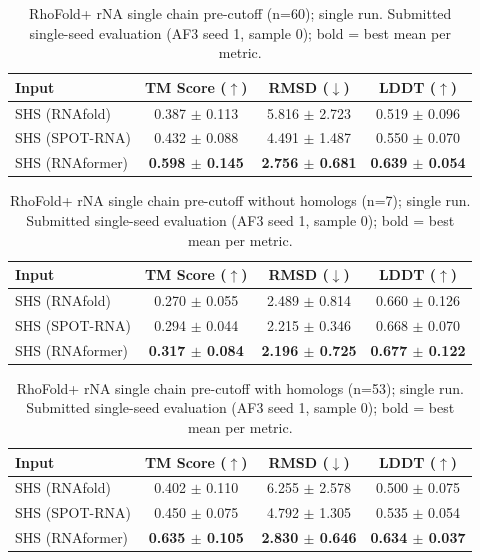 \begin{table}[htbp]
\centering
\caption{RhoFold+ rNA single chain pre-cutoff (n=60); single run. Submitted single-seed evaluation (AF3 seed 1, sample 0); bold = best mean per metric.}
\label{tab:rf_rna_single_chain_pre_cutoff}
\begin{tabular}{lccc}
\toprule
Input & TM Score ($\uparrow$) & RMSD ($\downarrow$) & LDDT ($\uparrow$) \\
\midrule
SHS (RNAfold) & 0.387 $\pm$ 0.113 & 5.816 $\pm$ 2.723 & 0.519 $\pm$ 0.096 \\
SHS (SPOT-RNA) & 0.432 $\pm$ 0.088 & 4.491 $\pm$ 1.487 & 0.550 $\pm$ 0.070 \\
SHS (RNAformer) & \textbf{0.598 $\pm$ 0.145} & \textbf{2.756 $\pm$ 0.681} & \textbf{0.639 $\pm$ 0.054} \\
\bottomrule
\end{tabular}
\end{table}

\begin{table}[htbp]
\centering
\caption{RhoFold+ rNA single chain pre-cutoff without homologs (n=7); single run. Submitted single-seed evaluation (AF3 seed 1, sample 0); bold = best mean per metric.}
\label{tab:rf_rna_single_chain_pre_cutoff_without_homologs}
\begin{tabular}{lccc}
\toprule
Input & TM Score ($\uparrow$) & RMSD ($\downarrow$) & LDDT ($\uparrow$) \\
\midrule
SHS (RNAfold) & 0.270 $\pm$ 0.055 & 2.489 $\pm$ 0.814 & 0.660 $\pm$ 0.126 \\
SHS (SPOT-RNA) & 0.294 $\pm$ 0.044 & 2.215 $\pm$ 0.346 & 0.668 $\pm$ 0.070 \\
SHS (RNAformer) & \textbf{0.317 $\pm$ 0.084} & \textbf{2.196 $\pm$ 0.725} & \textbf{0.677 $\pm$ 0.122} \\
\bottomrule
\end{tabular}
\end{table}

\begin{table}[htbp]
\centering
\caption{RhoFold+ rNA single chain pre-cutoff with homologs (n=53); single run. Submitted single-seed evaluation (AF3 seed 1, sample 0); bold = best mean per metric.}
\label{tab:rf_rna_single_chain_pre_cutoff_with_homologs}
\begin{tabular}{lccc}
\toprule
Input & TM Score ($\uparrow$) & RMSD ($\downarrow$) & LDDT ($\uparrow$) \\
\midrule
SHS (RNAfold) & 0.402 $\pm$ 0.110 & 6.255 $\pm$ 2.578 & 0.500 $\pm$ 0.075 \\
SHS (SPOT-RNA) & 0.450 $\pm$ 0.075 & 4.792 $\pm$ 1.305 & 0.535 $\pm$ 0.054 \\
SHS (RNAformer) & \textbf{0.635 $\pm$ 0.105} & \textbf{2.830 $\pm$ 0.646} & \textbf{0.634 $\pm$ 0.037} \\
\bottomrule
\end{tabular}
\end{table}

